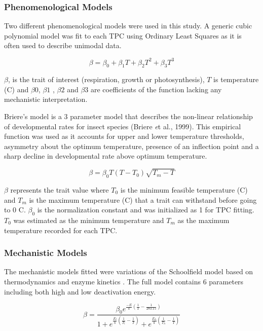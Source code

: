 \documentclass[12pt]{article}
\begin{document}
\begin{linenumbers}
  \subsubsection{Phenomenological Models}
Two different phenomenological models were used in this study. A generic cubic polynomial model was fit to each TPC using Ordinary Least Squares as it is often used to describe unimodal data. 

\begin{equation}
\beta = \beta_0 + \beta_1 T + \beta_2 T^2 + \beta_3 T^3\tag{1}
\end{equation}

\(\beta\), is the trait of interest (respiration, growth or photosynthesis), \(T\) is temperature (\degree C) and \(\beta0\), \(\beta1\) , \(\beta2\)  and \(\beta3\) are coefficients of the function lacking any mechanistic interpretation.  

Briere's model is a 3 parameter model that describes the non-linear relationship of developmental rates for insect species (Briere \textit et al., 1999). This empirical function was used as it accounts for upper and lower temperature thresholds, asymmetry about the optimum temperature, presence of an inflection point and a sharp decline in developmental rate above optimum temperature. 

\begin{equation}
\beta = \beta_0 T (T-T_0) \sqrt{T_m-T}\tag{2}
\end{equation}

\(\beta\) represents the trait value where \(T_0\) is the minimum feasible temperature (\degree C) and \(T_m\) is the maximum temperature (\degree C) that a trait can withstand before going to 0 \degree C. \(\beta_0\) is the normalization constant and was initialized as 1 for TPC fitting. \(T_0\) was estimated as the minimum temperature and \(T_m\) as the maximum temperature recorded for each TPC.

\subsubsection{Mechanistic Models}
The mechanistic models fitted were variations of the Schoolfield model based on thermodynamics and enzyme kinetics \cite{schoolfield1981non}. The full model contains 6 parameters including both high and low deactivation energy.

\begin{equation}
\beta = \frac{\beta_0 e^{\frac{-E}{k} (\frac{1}{T} - \frac{1}{283.15})}}
{ 1 + e^{\frac{E_l}{k} (\frac{1}{T_l} - \frac{1}{T})} + 
	e^{\frac{E_h}{k} (\frac{1}{T_h} - \frac{1}{T})}}\tag{3}
\end{equation}


\end{linenumbers}
\end{document}
